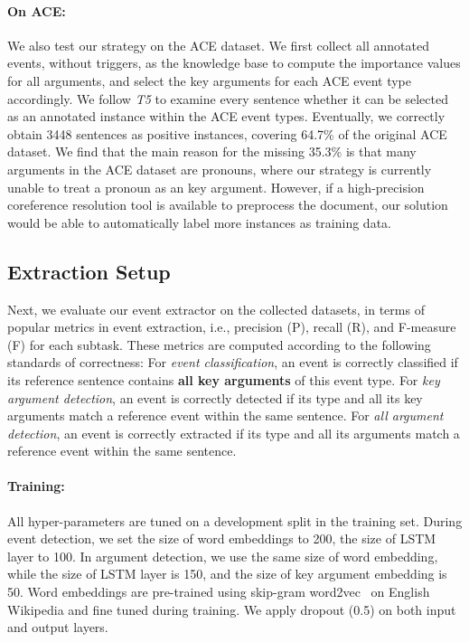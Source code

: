 \paragraph{On ACE:} We also test our strategy on the ACE dataset. 
We first collect all annotated events, without triggers, as the knowledge base
to compute the importance values for all arguments, and select the key arguments
for each ACE event type accordingly.  We follow \textit{T5} to examine every sentence
whether it can be selected as an annotated instance within the ACE event types.
Eventually, we correctly obtain 3448 sentences as positive instances, covering 
64.7\% of the original ACE dataset.  We find that the main reason for the 
missing 35.3\% is that many arguments in the ACE dataset are pronouns, 
where our strategy is currently unable to treat a pronoun as an key argument. However,
if a high-precision coreference resolution tool is available to preprocess the document,
our solution would be able to automatically label more instances as training data.

 \subsection{Extraction Setup}\label{sec:evalevent}
Next, we evaluate our event extractor on the collected datasets,
in terms of popular metrics in event extraction, i.e., precision (P), recall (R), and F-measure (F) for each subtask. These metrics are computed according to the following standards of correctness:
For \emph{event classification}, an event is correctly classified if its reference sentence contains \textbf{all key arguments} of this event type.
For \emph{key argument detection}, an event is correctly detected if its type and all its key arguments match a reference event within the same sentence.
For \emph{all argument detection}, an event is correctly extracted if its type and all its arguments match a reference event within the same sentence.

\paragraph{Training:} All hyper-parameters are tuned on a development split in the training set. During event detection, we set the size of word embeddings to 200, the size of LSTM layer to 100. In argument detection, we use the same size of word embedding, while the size of LSTM layer is 150, and the size of key argument embedding is 50. Word embeddings are pre-trained using skip-gram word2vec~\cite{mikolov2013distributed} on English Wikipedia and fine tuned during training. We apply dropout (0.5) on both input and output layers.




